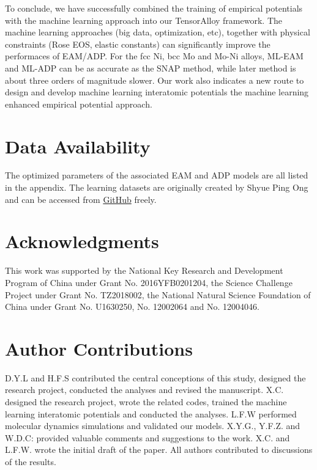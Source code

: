 \documentclass[final,3p,times]{elsarticle}
\begin{document}
To conclude, we have successfully combined the training of empirical potentials 
with the machine learning approach into our TensorAlloy framework. The machine 
learning approaches (big data, optimization, etc), 
together with physical constraints (Rose EOS, elastic constants) can 
significantly improve the performaces of EAM/ADP. For the fcc Ni, bcc Mo and 
Mo-Ni alloys, ML-EAM and ML-ADP can be as accurate as the SNAP method, while 
later method is about three orders of magnitude slower. Our work also indicates 
a new route to design and 
develop machine learning interatomic potentials \textemdash the machine learning 
enhanced empirical potential approach.

% 
%
\section*{Data Availability}
The optimized parameters of the associated EAM and ADP models are all listed in 
the appendix. The learning datasets are originally created by Shyue Ping Ong 
and can be accessed from 
\href{https://github.com/materialsvirtuallab/snap}{GitHub} freely.

% 
%
\section*{Acknowledgments}
\label{sec:acknowledgments}

This work was supported by the National Key Research and Development Program of 
China under Grant No. 2016YFB0201204, the Science Challenge Project under Grant 
No. TZ2018002, the National Natural Science Foundation of China under Grant 
No. U1630250, No. 12002064 and No. 12004046.

% 
%
\section*{Author Contributions}
D.Y.L and H.F.S contributed the central conceptions of this study, designed 
the research project, conducted the analyses and revised the manuscript. X.C. 
designed the research project, wrote the related codes, trained the machine 
learning interatomic potentials and conducted the analyses. L.F.W performed 
molecular dynamics simulations and validated our models. X.Y.G., Y.F.Z. and 
W.D.C: provided valuable comments and suggestions to the work. X.C. and L.F.W. 
wrote the initial draft of the paper. All authors contributed to discussions of 
the results.
\end{document}
